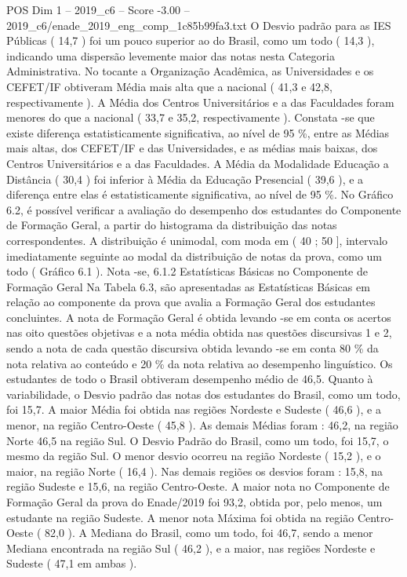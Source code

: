 \begin{textsample}{POS Dim 1 – 2019\_c6 – Score -3.00 – 2019\_c6/enade\_2019\_eng\_comp\_1c85b99fa3.txt}
O Desvio padrão para as IES Públicas ( 14,7 ) foi um pouco superior ao do Brasil, como um todo ( 14,3 ), indicando uma dispersão levemente maior das notas nesta Categoria Administrativa.
No tocante a Organização Acadêmica, as Universidades e os CEFET/IF obtiveram Média mais alta que a nacional ( 41,3 e 42,8, respectivamente ).
A Média dos Centros Universitários e a das Faculdades foram menores do que a nacional ( 33,7 e 35,2, respectivamente ).
Constata -se que existe diferença estatisticamente significativa, ao nível de 95 \%, entre as Médias mais altas, dos CEFET/IF e das Universidades, e as médias mais baixas, dos Centros Universitários e a das Faculdades.
A Média da Modalidade Educação a Distância ( 30,4 ) foi inferior à Média da Educação Presencial ( 39,6 ), e a diferença entre elas é estatisticamente significativa, ao nível de 95 \%.
No Gráfico 6.2, é possível verificar a avaliação do desempenho dos estudantes do Componente de Formação Geral, a partir do histograma da distribuição das notas correspondentes.
A distribuição é unimodal, com moda em ( 40 ; 50 ], intervalo imediatamente seguinte ao modal da distribuição de notas da prova, como um todo ( Gráfico 6.1 ).
Nota -se, 6.1.2 Estatísticas Básicas no Componente de Formação Geral Na Tabela 6.3, são apresentadas as Estatísticas Básicas em relação ao componente da prova que avalia a Formação Geral dos estudantes concluintes.
A nota de Formação Geral é obtida levando -se em conta os acertos nas oito questões objetivas e a nota média obtida nas questões discursivas 1 e 2, sendo a nota de cada questão discursiva obtida levando -se em conta 80 \% da nota relativa ao conteúdo e 20 \% da nota relativa ao desempenho linguístico.
Os estudantes de todo o Brasil obtiveram desempenho médio de 46,5.
Quanto à variabilidade, o Desvio padrão das notas dos estudantes do Brasil, como um todo, foi 15,7.
A maior Média foi obtida nas regiões Nordeste e Sudeste ( 46,6 ), e a menor, na região Centro-Oeste ( 45,8 ).
As demais Médias foram : 46,2, na região Norte 46,5 na região Sul.
O Desvio Padrão do Brasil, como um todo, foi 15,7, o mesmo da região Sul.
O menor desvio ocorreu na região Nordeste ( 15,2 ), e o maior, na região Norte ( 16,4 ).
Nas demais regiões os desvios foram : 15,8, na região Sudeste e 15,6, na região Centro-Oeste.
A maior nota no Componente de Formação Geral da prova do Enade/2019 foi 93,2, obtida por, pelo menos, um estudante na região Sudeste.
A menor nota Máxima foi obtida na região Centro-Oeste ( 82,0 ).
A Mediana do Brasil, como um todo, foi 46,7, sendo a menor Mediana encontrada na região Sul ( 46,2 ), e a maior, nas regiões Nordeste e Sudeste ( 47,1 em ambas ).

\end{textsample}
